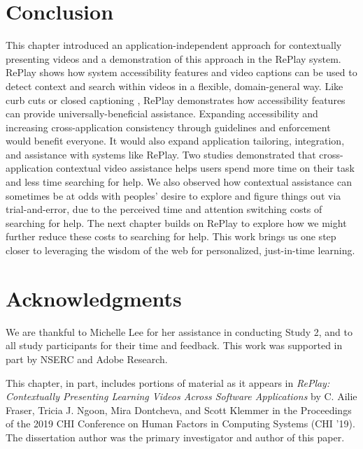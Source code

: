 \section{Conclusion}
This chapter introduced an application-independent approach for contextually presenting videos and a demonstration of this approach in the RePlay system. RePlay shows how system accessibility features and video captions can be used to detect context and search within videos in a flexible, domain-general way. Like curb cuts or closed captioning \cite{Rose2002}, RePlay demonstrates how accessibility features can provide universally-beneficial assistance. 
Expanding accessibility and increasing cross-application consistency through guidelines and enforcement would benefit everyone. It would also expand application tailoring, integration, and assistance with systems like RePlay. Two studies demonstrated that cross-application contextual video assistance helps users spend more time on their task and less time searching for help. We also observed how contextual assistance can sometimes be at odds with peoples' desire to explore and figure things out via trial-and-error, due to the perceived time and attention switching costs of searching for help.
The next chapter builds on RePlay to explore how we might further reduce these costs to searching for help.
This work brings us one step closer to leveraging the wisdom of the web for personalized, just-in-time learning.

\section{Acknowledgments}
We are thankful to Michelle Lee for her assistance in conducting Study 2, and to all study participants for their time and feedback. This work was supported in part by NSERC and Adobe Research.

This chapter, in part, includes portions of material as it appears in \textit{RePlay: Contextually Presenting Learning Videos Across Software Applications} by C. Ailie Fraser, Tricia J. Ngoon, Mira Dontcheva, and Scott Klemmer in the Proceedings of the 2019 CHI Conference on Human Factors in Computing Systems (CHI '19). The dissertation author was the primary investigator and author of this paper.